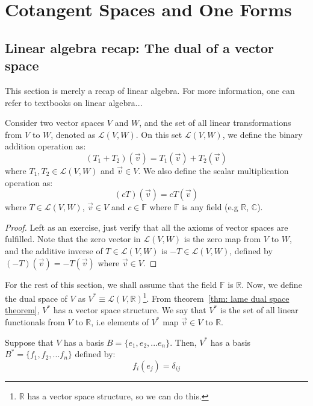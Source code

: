 \chapter{Cotangent Spaces and One Forms}
  \section{Linear algebra recap: The dual of a vector space}
    \label{sec: LA recap, dual of vector space}
    This section is merely a recap of linear algebra. For more information,
    one can refer to textbooks on linear algebra...

    Consider two vector spaces $V$ and $W$, and the set of all linear
    transformations from $V$ to $W$, denoted as $\mathcal{L}(V,W)$. On this
    set $\mathcal{L}(V,W)$, we define the binary addition operation as:
    \[(T_1 + T_2)(\vec{v}) = T_1(\vec{v}) + T_2(\vec{v})\]
    where $T_1,T_2 \in \mathcal{L}(V,W)$ and $\vec{v} \in V$.
    We also define the scalar multiplication operation as: 
    \[(cT)(\vec{v}) = cT(\vec{v})\] 
    where $T \in \mathcal{L}(V,W)$, $\vec{v} \in V$ and $c \in \mathbb{F}$
    where $\mathbb{F}$ is any field (e.g $\mathbb{R}$, $\mathbb{C}$).
    \begin{theorem}
      \label{thm: lame dual space theorem}
    \end{theorem}
    \begin{proof}
      Left as an exercise, just verify that all the axioms of vector spaces
      are fulfilled. Note that the zero vector in $\mathcal{L}(V,W)$ is the
      zero map from $V$ to $W$, and the additive inverse of $T \in
      \mathcal{L}(V,W)$ is $-T \in \mathcal{L}(V,W)$, defined by $(-T)(\vec{v})
      = - T(\vec{v})$ where $\vec{v} \in V$.
    \end{proof}
    For the rest of this section, we shall assume that the field $\mathbb{F}$
    is $\mathbb{R}$. Now, we define the dual space of $V$ as $V^{*} \equiv
    \mathcal{L}(V, \mathbb{R})$\footnote{$\mathbb{R}$ has a vector space
    structure, so we can do this.}. From theorem~\ref{thm: lame dual space
    theorem}, $V^{*}$ has a vector space structure. We say that $V^{*}$ is
    the set of all linear functionals from $V$ to $\mathbb{R}$, i.e elements
    of $ V^{*} $ map $\vec{v} \in V$ to $\mathbb{R}$. 

    Suppose that $V$ has a basis $B = \{e_1, e_2, ... e_n\}$. Then, $V^*$ has
    a basis $B^* = \{f_1, f_2, ... f_n\}$ defined by: \[f_i(e_j) =
    \delta_{ij}\]
    
